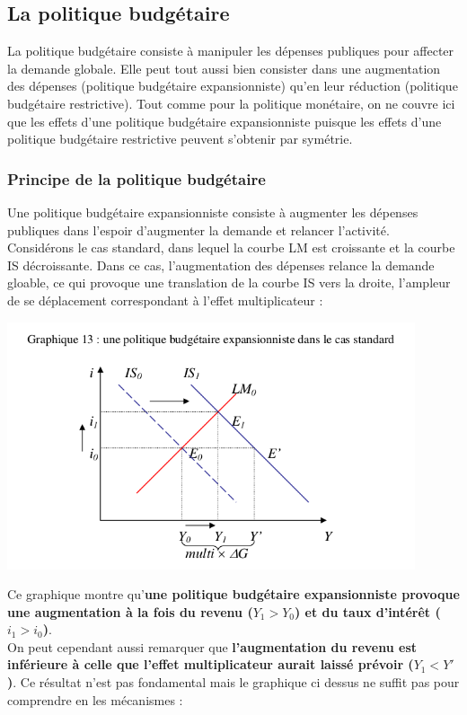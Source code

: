 \documentclass[10pt]{book}
\begin{document}
\subsection{La politique budgétaire}
La politique budgétaire consiste à manipuler les dépenses publiques pour affecter la demande globale. Elle peut tout aussi bien consister dans une augmentation des dépenses (politique budgétaire expansionniste) qu'en leur réduction (politique budgétaire restrictive). Tout comme pour la politique monétaire, on ne couvre ici que les effets d'une politique budgétaire expansionniste puisque les effets d'une politique budgétaire restrictive peuvent s'obtenir par symétrie.
\subsubsection{Principe de la politique budgétaire}
Une politique budgétaire expansionniste consiste à augmenter les dépenses publiques dans l'espoir d'augmenter la demande et relancer l'activité. Considérons le cas standard, dans lequel la courbe LM est croissante et la courbe IS décroissante. Dans ce cas, l'augmentation des dépenses relance la demande gloable, ce qui provoque une translation de la courbe IS vers la droite, l'ampleur de se déplacement correspondant à l'effet multiplicateur :
\begin{center}
  \includegraphics[width=12cm]{graph37.png}
\end{center}
Ce graphique montre qu'\textbf{une politique budgétaire expansionniste provoque une augmentation à la fois du revenu ($Y_1 > Y_0$) et du taux d'intérêt ($i_1 > i_0$)}. \\
On peut cependant aussi remarquer que \textbf{l'augmentation du revenu est inférieure à celle que l'effet multiplicateur aurait laissé prévoir ($Y_1 < Y'$)}. Ce résultat n'est pas fondamental mais le graphique ci dessus ne suffit pas pour comprendre en les mécanismes :
\end{document}
